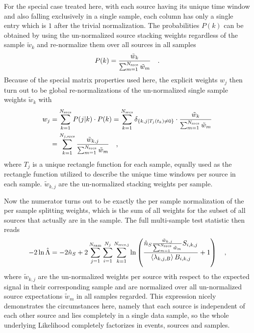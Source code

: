 For the special case treated here, with each source having its unique time window and also falling exclusively in a single sample, each column has only a single entry which is $1$ after the trivial normalization.
The probabilities $P(k)$ can be obtained by using the un-normalized source stacking weights regardless of the sample $\tilde{w}_k$ and re-normalize them over all sources in all samples
\begin{equation}
  P(k) = \frac{\tilde{w}_k}{\sum_{m=1}^{N_\text{srcs}} \tilde{w}_m}
  \quad\text{.}
\end{equation}
Because of the special matrix properties used here, the explicit weights $w_j$ then turn out to be global re-normalizations of the un-normalized single sample weights $\tilde{w}_k$ with
\begin{align}
  w_j
    &= \sum_{k=1}^{N_\text{srcs}} P(j|k)\cdot P(k)
    = \sum_{k=1}^{N_\text{srcs}}
      \delta_{\{k,j|T_j(t_k)\neq 0\}} \cdot
      \frac{\tilde{w}_k}{\sum_{m=1}^{N_\text{srcs}} \tilde{w}_m} \\
    &= \sum_{k=1}^{N_{j,\text{srcs}}}
      \frac{\tilde{w}_{k,j}}{\sum_{m=1}^{N_\text{srcs}} \tilde{w}_m}
  \quad\text{,}
\end{align}
where $T_j$ is a unique rectangle function for each sample, equally used as the rectangle function utilized to describe the unique time windows per source in each sample.
$\tilde{w}_{k,j}$ are the un-normalized stacking weights per sample.

Now the numerator turns out to be exactly the per sample normalization of the per sample splitting weights, which is the sum of all weights for the subset of all sources that actually are in the sample.
The full multi-sample test statistic then reads
\begin{equation}
  -2\ln\hat{\Lambda}
  = -2\hat{n}_S +
      2\sum_{j=1}^{N_\text{sam}} \sum_{i=1}^{N_j} \sum_{k=1}^{N_\text{srcs,j}}
      \ln\left(
        \frac{\hat{n}_{S}\frac{\tilde{w}_{k,j}}{\sum_{m=1}^{N_\text{srcs}}
              \tilde{w}_m} S_{i,k,j}}
             {\Braket{\lambda_{k,j,B}} B_{i,k,j}}
        + 1
      \right)
  \quad\text{,}
\end{equation}
where $\tilde{w}_{k,j}$ are the un-normalized weights per source with respect to the expected signal in their corresponding sample and are normalized over all un-normalized source expectations $\tilde{w}_m$ in all samples regarded.
This expression nicely demonstrates the circumstances here, namely that each source is independent of each other source and lies completely in a single data sample, so the whole underlying Likelihood completely factorizes in events, sources and samples.


